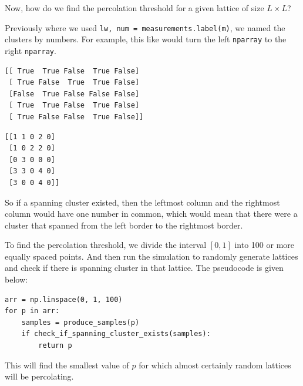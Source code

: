 \documentclass[compress]{beamer}
\begin{document}
\begin{frame}[fragile]
    Now, how do we find the percolation threshold for a given lattice of size \(L\times
    L\)? 
    \vspace{12pt}

    Previously where we used \texttt{lw, num = measurements.label(m)}, we named the
    clusters by numbers. For example, this like would turn the left \texttt{nparray} to
    the right \texttt{nparray}.

    \vspace{10pt}

    \begin{minipage}{.6\linewidth}
\begin{lstlisting}
[[ True  True False  True False]
 [ True False  True  True False]
 [False  True False False False]
 [ True  True False  True False]
 [ True False False  True False]]
\end{lstlisting}
    \end{minipage}\hfill%
    \begin{minipage}{.3\linewidth}
\begin{lstlisting}
[[1 1 0 2 0]
 [1 0 2 2 0]
 [0 3 0 0 0]
 [3 3 0 4 0]
 [3 0 0 4 0]]
\end{lstlisting}
    \end{minipage}
\end{frame}

\begin{frame}
    So if a spanning cluster existed, then the leftmost column and the rightmost column
    would have one number in common, which would mean that there were a cluster that
    spanned from the left border to the rightmost border.
\end{frame}

\begin{frame}[fragile]
    To find the percolation threshold, we divide the interval \([0, 1]\) into 100 or more
    equally spaced points. And then run the simulation to randomly generate lattices and
    check if there is spanning cluster in that lattice. The pseudocode is given below:

    \begin{lstlisting}
arr = np.linspace(0, 1, 100)
for p in arr:
    samples = produce_samples(p)
    if check_if_spanning_cluster_exists(samples):
        return p
    \end{lstlisting}

    This will find the smallest value of \(p\) for which almost certainly random lattices
    will be percolating.
\end{frame}
\end{document}
